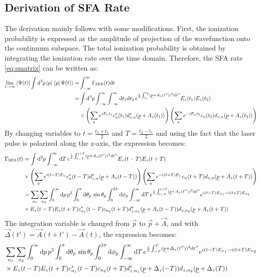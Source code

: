 \subsection{Derivation of SFA Rate}
The derivation mainly follows \cite{Theory_NPS} with some modifications.
First, the ionization probability is expressed as the amplitude of projection of the wavefunction onto the continuum subspace.
The total ionization probability is obtained by integrating the ionization rate over the time domain.
Therefore, the SFA rate \eqref{eq:smatrix} can be written as:
\begin{align*}
    \lim_{t\to\infty}\braket{\Psi(t)|\int \dd^3 p \ket{p}\bra{p}\Psi(t)} = &\int_{-\infty}^{\infty} \Gamma_{\mathrm{SFA}}(t) \dd t \\ %
    = &\int \dd^3 p \int_{-\infty}^{\infty} \int_{-\infty}^{\infty} \dd t_1  \dd t_2 \, e^{\frac{i}{2}\int_{t_1}^{t_2}(\uvec{p}+A_z(t''))^2\dd t''} E_z(t_1)E_z(t_2)\\
    &\times\left(\sum_{n}e^{iE_nt_1}c_n^*(t_1)d_{z,n}^*(\uvec{p}+A_z(t_1))\right)\left(\sum_{n}e^{-iE_nt_2}c_n(t_2)d_{z,n}(\uvec{p}+A_z(t_2))\right)
\end{align*}
By changing variables to $t=\frac{t_2+t_1}{2}$ and $T=\frac{t_2-t_1}{2}$ and using the fact that the laser pulse is polarized along the z-axis, the expression becomes:
\begin{align*}
    \Gamma_{\mathrm{SFA}}(t) &= \int \mathrm{d}^3 p \int_{-\infty}^{\infty} \mathrm{d} T \, e^{\frac{i}{2}\int_{t-T}^{t+T}(\underline{p}+A_z(t''))^2\mathrm{d} t''} E_z(t-T) E_z(t+T)\\
    &\times\left(\sum_{n}e^{i(t-T)E_n}c_n^*(t-T)d_{z,n}^*(\underline{p}+A_z(t-T))\right)\left(\sum_{n}e^{-i(t+T)E_n}c_n(t+T)d_{z,n}(\underline{p}+A_z(t+T))\right)\\
    &= \sum_{n_1}\sum_{n_2} \int_0^{\infty} \mathrm{d} p\,p^2\int_0^{\pi} \mathrm{d}\theta_p\,\sin\theta_p \int_0^{2\pi}\mathrm{d} \phi_p\int_{-\infty}^{\infty} \mathrm{d} T \, e^{\frac{i}{2}\int_{t-T}^{t+T}(\underline{p}+A_z(t''))^2\mathrm{d} t''} e^{i(t-T)E_{n_1}-i(t+T)E_{n_2}}\\
    &\times E_z(t-T) E_z(t+T)c_{n_1}^*(t-T)c_{n_2}(t+T) d_{z,n_1}^*(\underline{p}+A_z(t-T))d_{z,n_2}(\underline{p}+A_z(t+T))
\end{align*}
The integration variable is changed from $\vec{p}$ to $\vec{p}+\vec{A}$, and with $\vec{\Delta}(t') = \vec{A}(t+t') - \vec{A}(t)$, the expression becomes:
\begin{align*}
    &\sum_{n_1}\sum_{n_2} \int_0^{\infty} \mathrm{d} p\,p^2\int_0^{\pi} \mathrm{d}\theta_p\,\sin\theta_p \int_0^{2\pi}\mathrm{d} \phi_p\int_{-\infty}^{\infty} \mathrm{d} T \, e^{\frac{i}{2}\int_{-T}^{T}(\underline{p}+\Delta_z(t''))^2\mathrm{d} t''} e^{i(t-T)E_{n_1}-i(t+T)E_{n_2}}\\
    &\times E_z(t-T) E_z(t+T)c_{n_1}^*(t-T)c_{n_2}(t+T) d_{z,n_1}^*(\underline{p}+\Delta_z(-T))d_{z,n_2}(\underline{p}+\Delta_z(T))
\end{align*} 
